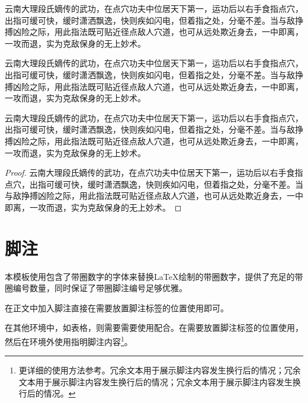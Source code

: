 \documentclass[print, doctor, vlined]{DissertUESTC}
\begin{document}
	\begin{corollary}
		云南大理段氏嫡传的武功，在点穴功夫中位居天下第一，运功后以右手食指点穴，出指可缓可快，缓时潇洒飘逸，快则疾如闪电，但着指之处，分毫不差。当与敌挣搏凶险之际，用此指法既可贴近径点敌人穴道，也可从远处欺近身去，一中即离，一攻而退，实为克敌保身的无上妙术。
	\end{corollary}
	
	\begin{lemma}
		云南大理段氏嫡传的武功，在点穴功夫中位居天下第一，运功后以右手食指点穴，出指可缓可快，缓时潇洒飘逸，快则疾如闪电，但着指之处，分毫不差。当与敌挣搏凶险之际，用此指法既可贴近径点敌人穴道，也可从远处欺近身去，一中即离，一攻而退，实为克敌保身的无上妙术。
	\end{lemma}

	\begin{assumption}
		云南大理段氏嫡传的武功，在点穴功夫中位居天下第一，运功后以右手食指点穴，出指可缓可快，缓时潇洒飘逸，快则疾如闪电，但着指之处，分毫不差。当与敌挣搏凶险之际，用此指法既可贴近径点敌人穴道，也可从远处欺近身去，一中即离，一攻而退，实为克敌保身的无上妙术。
	\end{assumption}
	
	\begin{proof}
		云南大理段氏嫡传的武功，在点穴功夫中位居天下第一，运功后以右手食指点穴，出指可缓可快，缓时潇洒飘逸，快则疾如闪电，但着指之处，分毫不差。当与敌挣搏凶险之际，用此指法既可贴近径点敌人穴道，也可从远处欺近身去，一中即离，一攻而退，实为克敌保身的无上妙术。
	\end{proof}
	
	\newpage

	\section{脚注}
	
	本模板使用包含了带圈数字的字体来替换LaTeX绘制的带圈数字，提供了充足的带圈编号数量，同时保证了带圈脚注编号足够优雅。
	
	在正文中加入脚注直接在需要放置脚注标签的位置使用即可。
	
	在其他环境中，如表格，则需要需要使用配合。在需要放置脚注标签的位置使用，然后在环境外使用指明脚注内容\footnote{更详细的使用方法参考\href{https://blog.csdn.net/xovee/article/details/127563209}{}。冗余文本用于展示脚注内容发生换行后的情况；冗余文本用于展示脚注内容发生换行后的情况；冗余文本用于展示脚注内容发生换行后的情况。}。
	
\end{document}
